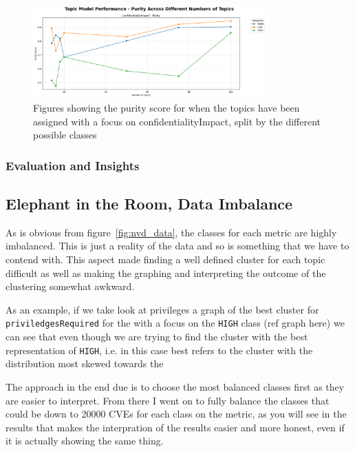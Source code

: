 \documentclass[12pt]{article}
\begin{document}
\begin{figure}[ht] \centering
	\includegraphics[width=0.8\textwidth]{figures/purity/topic_model_performance_purity_ground_truth_confidentialityImpact.png}
	\caption{\label{fig:purity_20_confidentiality}Figures showing the purity score
		for when the topics have been assigned with a focus on confidentialityImpact, split by the different
		possible classes}
\end{figure}


\subsubsection{Evaluation and Insights}

\subsection{Elephant in the Room, Data Imbalance}

As is obvious from figure~\ref{fig:nvd_data}, the classes for each metric are highly imbalanced.
This is just a reality of the data and so is something that we have to contend with. This aspect
made finding a well defined cluster for each topic difficult as well as making the graphing and
interpreting the outcome of the clustering somewhat awkward.

As an example, if we take look at privileges a graph of the best cluster for
\texttt{priviledgesRequired} for the with a focus on the \texttt{HIGH} class (ref graph here) we can see
that even though we are trying to find the cluster with the best representation of \texttt{HIGH},
i.e. in this case best refers to the cluster with the distribution most skewed towards the

The approach in the end due is to
choose the most balanced classes first as they are easier to interpret. From there I went on to
fully balance the classes that could be down to 20000 CVEs for each class on the metric, as you will
see in the results that makes the interpration of the results easier and more honest, even if it is
actually showing the same thing.
\end{document}
